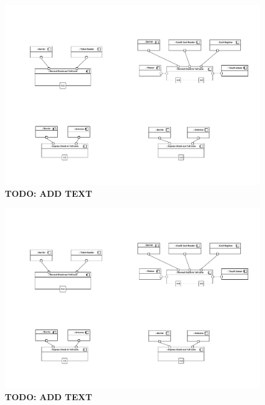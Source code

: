 \begin{figure}
\centerline{\includegraphics[width=\textwidth]{img/composite_structure_diagrams/cscd_toll_lane_express_out}}
\caption{\textbf{TODO: ADD TEXT}}
\label{fig:csd_tleo}
\end{figure}

\begin{figure}
\centerline{\includegraphics[width=\textwidth]{img/composite_structure_diagrams/cscd_toll_lane_normal_in}}
\caption{\textbf{TODO: ADD TEXT}}
\label{fig:csd_tlni}
\end{figure}

